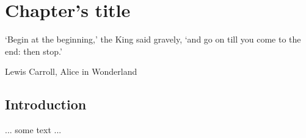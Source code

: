 \chapter{Chapter's title}
\label{cha:chapter1}

\epigraph{`Begin at the beginning,' the King said gravely, `and go on till you come to the end: then stop.'}{{\epiauthor Lewis Carroll}, Alice in Wonderland}

\section{Introduction}
\label{sec:chapter1:introduction}

... some text ...

\lipsum[0-10]

